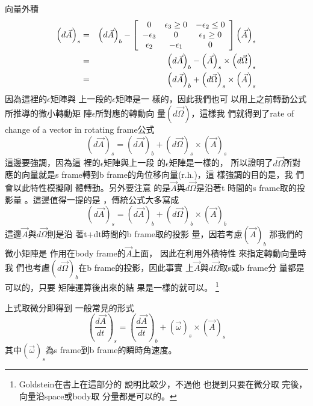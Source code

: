 \documentclass[12pt,a4paper]{article}
\begin{document}
向量外積%
\begin{eqnarray*}
\left( d\vec{A}\right) _{s} &=&\left( d\vec{A}\right) _{b}-\left[ 
\begin{array}{ccc}
0 & \epsilon _{3}\geq 0 & -\epsilon _{2}\leq 0 \\ 
-\epsilon _{3} & 0 & \epsilon _{1}\geq 0 \\ 
\epsilon _{2} & -\epsilon _{1} & 0%
\end{array}%
\right] \left( \vec{A}\right) _{s} \\
&=&\left( d\vec{A}\right) _{b}-\left( \vec{A}\right) _{s}\times \left( d\vec{%
\Omega}\right) _{s} \\
&=&\left( d\vec{A}\right) _{b}+\left( d\vec{\Omega}\right) _{s}\times \left( 
\vec{A}\right) _{s}
\end{eqnarray*}%
因為這裡的$\epsilon $矩陣與%
上一段的$\epsilon $矩陣是一%
樣的，因此我們也可%
以用上之前轉動公式%
所推導的微小轉動矩%
陣$\epsilon $所對應的轉動向%
量$\left( d\vec{\Omega}\right) $，這樣我%
們就得到了rate of change of a vector in
rotating frame公式%
\begin{equation}
\left( d\vec{A}\right) _{s}=\left( d\vec{A}\right) _{b}+\left( d\vec{\Omega}%
\right) _{s}\times \left( \vec{A}\right) _{s}  \label{rateofdomega}
\end{equation}%
這邊要強調，因為這%
裡的$\epsilon $矩陣與上一段%
的$\epsilon $矩陣是一樣的，%
所以證明了$d\vec{\Omega}$所對%
應的向量就是s frame轉到b
frame的角位移向量(r.h.)，這%
樣強調的目的是，我%
們會以此特性模擬剛%
體轉動。另外要注意%
的是$\vec{A}$與$d\vec{\Omega}$是沿著t%
時間的s frame取的投影量%
。這邊值得一提的是%
，傳統公式大多寫成%
\begin{equation*}
\left( d\vec{A}\right) _{s}=\left( d\vec{A}\right) _{b}+\left( d\vec{\Omega}%
\right) _{b}\times \left( \vec{A}\right) _{b}
\end{equation*}%
這邊$\vec{A}$與$d\vec{\Omega}$則是沿%
著t+dt時間的b frame取的投影%
量，因若考慮$\left( \vec{A}\right) _{b}$%
那我們的微小矩陣是%
作用在body frame的$\vec{A}$上面，%
因此在利用外積特性%
來指定轉動向量時我%
們也考慮$\left( d\vec{\Omega}\right) _{b}$在b
frame的投影$， $因此事實%
上$\vec{A}$與$d\vec{\Omega}$取s或b frame分%
量都是可以的，只要%
矩陣運算後出來的結%
果是一樣的就可以。%
\footnote{%
Goldstein在書上在這部分的%
說明比較少，不過他%
也提到只要在微分取%
完後，向量沿space或body取%
分量都是可以的\cite[p. 176]%
{goldstein}。}

\bigskip 上式取微分即得到%
一般常見的形式%
\begin{equation}
\left( \frac{d\vec{A}}{dt}\right) _{s}=\left( \frac{d\vec{A}}{dt}\right)
_{b}+\left( \vec{\omega}\right) _{s}\times \left( \vec{A}\right) _{s}
\label{rateofchange}
\end{equation}%
其中$\left( \vec{\omega}\right) _{s}$為s frame到b
frame的瞬時角速度。
\end{document}
